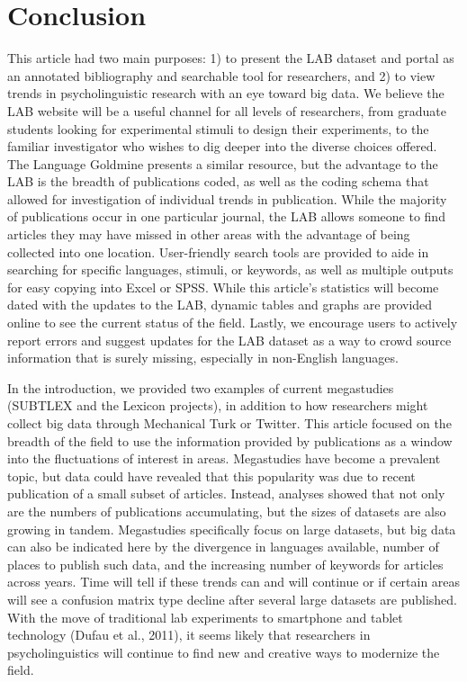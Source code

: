 \documentclass[english,,man]{apa6}
\theoremstyle{definition}
\theoremstyle{definition}
\theoremstyle{definition}
\theoremstyle{remark}
\begin{document}
\hypertarget{conclusion}{%
\section{Conclusion}\label{conclusion}}

This article had two main purposes: 1) to present the LAB dataset and
portal as an annotated bibliography and searchable tool for researchers,
and 2) to view trends in psycholinguistic research with an eye toward
big data. We believe the LAB website will be a useful channel for all
levels of researchers, from graduate students looking for experimental
stimuli to design their experiments, to the familiar investigator who
wishes to dig deeper into the diverse choices offered. The Language
Goldmine presents a similar resource, but the advantage to the LAB is
the breadth of publications coded, as well as the coding schema that
allowed for investigation of individual trends in publication. While the
majority of publications occur in one particular journal, the LAB allows
someone to find articles they may have missed in other areas with the
advantage of being collected into one location. User-friendly search
tools are provided to aide in searching for specific languages, stimuli,
or keywords, as well as multiple outputs for easy copying into Excel or
SPSS. While this article's statistics will become dated with the updates
to the LAB, dynamic tables and graphs are provided online to see the
current status of the field. Lastly, we encourage users to actively
report errors and suggest updates for the LAB dataset as a way to crowd
source information that is surely missing, especially in non-English
languages.

In the introduction, we provided two examples of current megastudies
(SUBTLEX and the Lexicon projects), in addition to how researchers might
collect big data through Mechanical Turk or Twitter. This article
focused on the breadth of the field to use the information provided by
publications as a window into the fluctuations of interest in areas.
Megastudies have become a prevalent topic, but data could have revealed
that this popularity was due to recent publication of a small subset of
articles. Instead, analyses showed that not only are the numbers of
publications accumulating, but the sizes of datasets are also growing in
tandem. Megastudies specifically focus on large datasets, but big data
can also be indicated here by the divergence in languages available,
number of places to publish such data, and the increasing number of
keywords for articles across years. Time will tell if these trends can
and will continue or if certain areas will see a confusion matrix type
decline after several large datasets are published. With the move of
traditional lab experiments to smartphone and tablet technology (Dufau
et al., 2011), it seems likely that researchers in psycholinguistics
will continue to find new and creative ways to modernize the field.
\end{document}
